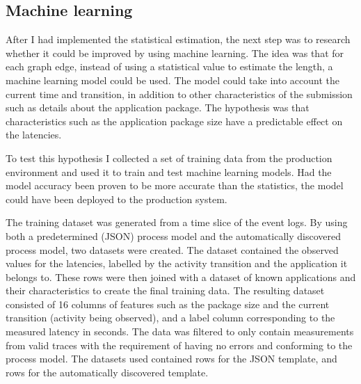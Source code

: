 

\subsection{Machine learning}
\label{sec:ml-estimation}

After I had implemented the statistical estimation, the next step was to research whether it could be improved by using machine learning. 
The idea was that for each graph edge, instead of using a statistical value to estimate the length, a machine learning model could be used.
The model could take into account the current time and transition, in addition to other characteristics of the submission such as details about the application package.
The hypothesis was that characteristics such as the application package size have a predictable effect on the latencies.

To test this hypothesis I collected a set of training data from the production environment and used it to train and test machine learning models.
Had the model accuracy been proven to be more accurate than the statistics, the model could have been deployed to the production system.

The training dataset was generated from a time slice of the event logs. 
By using both a predetermined (JSON) process model  and the automatically discovered process model, two datasets were created. The dataset contained the observed values for the latencies, labelled by the activity transition and the application it belongs to.
These rows were then joined with a dataset of known applications and their characteristics to create the final training data.
The resulting dataset consisted of 16 columns of features such as the package size and the current transition (activity being observed), and a label column corresponding to the measured latency in seconds. 
The data was filtered to only contain measurements from valid traces with the requirement of having no errors and conforming to the process model.
The datasets used contained  rows for the JSON template, and  rows for the automatically discovered template.

